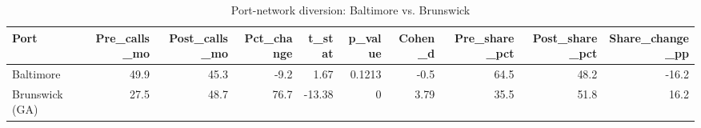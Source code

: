 \begin{table}
\caption{Port-network diversion: Baltimore vs. Brunswick}
\label{tab:table4_diversion}
\begin{tabular}{lrrrrrrrrr}
\toprule
Port & Pre\_calls\_mo & Post\_calls\_mo & Pct\_change & t\_stat & p\_value & Cohen\_d & Pre\_share\_pct & Post\_share\_pct & Share\_change\_pp \\
\midrule
Baltimore & 49.9 & 45.3 & -9.2 & 1.67 & 0.1213 & -0.5 & 64.5 & 48.2 & -16.2 \\
Brunswick (GA) & 27.5 & 48.7 & 76.7 & -13.38 & 0 & 3.79 & 35.5 & 51.8 & 16.2 \\
\bottomrule
\end{tabular}
\end{table}
